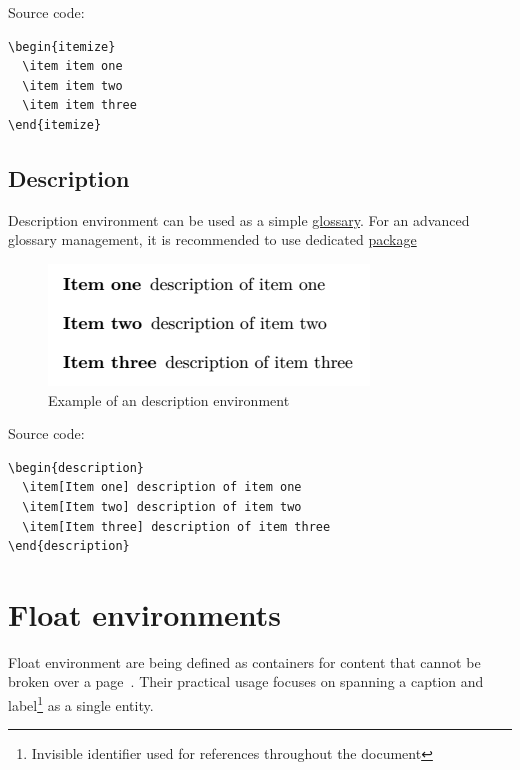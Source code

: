 Source code:

\begin{Verbatim}
\begin{itemize}
  \item item one
  \item item two
  \item item three
\end{itemize} 
\end{Verbatim}

\subsection{Description}

Description environment can be used as a simple \hyperref[section:glossaries]{glossary}. For an advanced glossary management, it is recommended to use dedicated \hyperref[section:glossaries]{package}

\begin{figure}[H]
\centering
\includegraphics[scale=0.8]{content/LaTeX/figures/description_outcome_example.png}
\caption{Example of an description environment}
\label{fig:description_outcome_example}
\end{figure}

Source code:

\begin{Verbatim}
\begin{description}
  \item[Item one] description of item one
  \item[Item two] description of item two
  \item[Item three] description of item three
\end{description} 
\end{Verbatim}

\section{Float environments}

Float environment are being defined as containers for content that cannot be broken over a page~\cite{wiki_floats_figures_captions}. Their practical usage focuses on spanning a caption and label\footnote{Invisible identifier used for references throughout the document} as a single entity.\\

